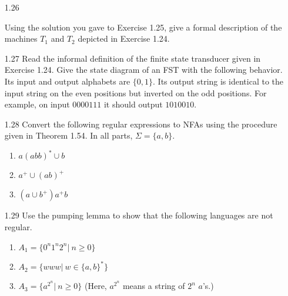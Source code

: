 \begin{enumerate}

    \item [1.26]
          
          Using the solution you gave to Exercise 1.25, give a formal description of the machines $T_1$ and $T_2$ depicted in Exercise 1.24.
          
    \item [1.27]
          Read the informal definition of the finite state transducer given in Exercise 1.24. Give the state diagram of an FST with the following behavior. Its input and output alphabets are $\{0,1\}$. Its output string is identical to the input string on the even positions but inverted on the odd positions. For example, on input $0000111$ it should output $1010010$.
          
          \begin{figure}[H]
              \centering
          \end{figure}
          
    \item [1.28]
          Convert the following regular expressions to NFAs using the procedure given in Theorem 1.54. In all parts, $\Sigma=\{a,b\}$. \begin{enumerate}
              \item $a(abb)^\ast \cup b$
              \item $a^+ \cup (ab)^+$
              \item $(a \cup b^+)a^+b$
          \end{enumerate}
    \item [1.29]
          Use the pumping lemma to show that the following languages are not regular.
          \begin{enumerate}
              \item $A_1 =\{0^n 1^n 2^n | ~n \geq 0\}$
              \item $A_2 =\{www|~w \in \{a,b\}^\ast\}$
              \item $A_3 = \{ a^{2^n} | ~n \geq 0\}$  (Here, $a^{2^n}$ means a string of $2^n$ $a$’s.)
          \end{enumerate}
          

\end{enumerate}
